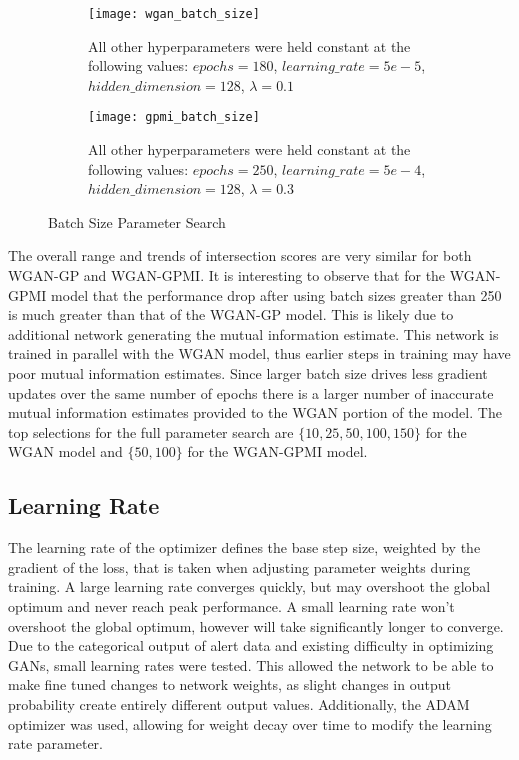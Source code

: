 \begin{figure}[!htbp]
	\centering
	\begin{subfigure}{.7\textwidth}
		\texttt{[image: wgan\_batch\_size]}
	\end{subfigure}%
	\begin{subfigure}{.3\textwidth}
		\caption{
			All other hyperparameters were held constant at the following values: $epochs=180$, $learning\_rate=5e-5$, $hidden\_dimension=128$, $\lambda=0.1$
		}
		\label{fig:wgan_batch_size}
	\end{subfigure}%

	\begin{subfigure}{.7\textwidth}
		\texttt{[image: gpmi\_batch\_size]}
	\end{subfigure}%
	\begin{subfigure}{.3\textwidth}
		\caption{
			All other hyperparameters were held constant at the following values: $epochs=250$, $learning\_rate=5e-4$, $hidden\_dimension=128$, $\lambda=0.3$
		}
		\label{fig:gpmi_batch_size}
	\end{subfigure}%
	\caption{Batch Size Parameter Search}
\end{figure}

The overall range and trends of intersection scores are very similar for both WGAN-GP and WGAN-GPMI. It is interesting to observe that for the WGAN-GPMI model that the performance drop after using batch sizes greater than 250 is much greater than that of the WGAN-GP model. This is likely due to additional network generating the mutual information estimate. This network is trained in parallel with the WGAN model, thus earlier steps in training may have poor mutual information estimates. Since larger batch size drives less gradient updates over the same number of epochs there is a larger number of inaccurate mutual information estimates provided to the WGAN portion of the model. The top selections for the full parameter search are $\{10,25,50,100,150\}$ for the WGAN model and $\{50,100\}$ for the WGAN-GPMI model.

\subsection{Learning Rate}
\label{sec:lr}

The learning rate of the optimizer defines the base step size, weighted by the gradient of the loss, that is taken when adjusting parameter weights during training. A large learning rate converges quickly, but may overshoot the global optimum and never reach peak performance. A small learning rate won't overshoot the global optimum, however will take significantly longer to converge. Due to the categorical output of alert data and existing difficulty in optimizing GANs, small learning rates were tested. This allowed the network to be able to make fine tuned changes to network weights, as slight changes in output probability create entirely different output values. Additionally, the ADAM optimizer was used, allowing for weight decay over time to modify the learning rate parameter.


